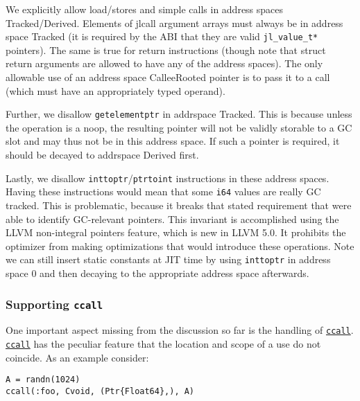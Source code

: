 We explicitly allow load/stores and simple calls in address spaces Tracked/Derived. Elements of jlcall argument arrays must always be in address space Tracked (it is required by the ABI that they are valid \texttt{jl\_value\_t*} pointers). The same is true for return instructions (though note that struct return arguments are allowed to have any of the address spaces). The only allowable use of an address space CalleeRooted pointer is to pass it to a call (which must have an appropriately typed operand).



Further, we disallow \texttt{getelementptr} in addrspace Tracked. This is because unless the operation is a noop, the resulting pointer will not be validly storable to a GC slot and may thus not be in this address space. If such a pointer is required, it should be decayed to addrspace Derived first.



Lastly, we disallow \texttt{inttoptr}/\texttt{ptrtoint} instructions in these address spaces. Having these instructions would mean that some \texttt{i64} values are really GC tracked. This is problematic, because it breaks that stated requirement that we{\textquotesingle}re able to identify GC-relevant pointers. This invariant is accomplished using the LLVM {\textquotedbl}non-integral pointers{\textquotedbl} feature, which is new in LLVM 5.0. It prohibits the optimizer from making optimizations that would introduce these operations. Note we can still insert static constants at JIT time by using \texttt{inttoptr} in address space 0 and then decaying to the appropriate address space afterwards.



\hypertarget{5598613901277707990}{}


\subsubsection{Supporting \texttt{ccall}}



One important aspect missing from the discussion so far is the handling of \hyperlink{14245046751182637566}{\texttt{ccall}}. \hyperlink{14245046751182637566}{\texttt{ccall}} has the peculiar feature that the location and scope of a use do not coincide. As an example consider:




\begin{verbatim}
A = randn(1024)
ccall(:foo, Cvoid, (Ptr{Float64},), A)
\end{verbatim}



